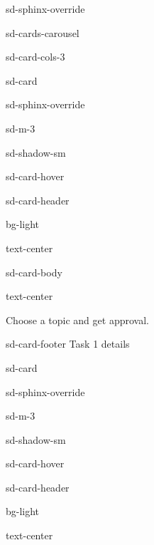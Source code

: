 \documentclass[letterpaper,10pt,english]{jupyterBook}
\let\sphinxpxdimen\pdfpxdimen\else\newdimen\sphinxpxdimen
\begin{document}
\begin{sphinxuseclass}{sd-sphinx-override}
\begin{sphinxuseclass}{sd-cards-carousel}
\begin{sphinxuseclass}{sd-card-cols-3}
\begin{sphinxuseclass}{sd-card}
\begin{sphinxuseclass}{sd-sphinx-override}
\begin{sphinxuseclass}{sd-m-3}
\begin{sphinxuseclass}{sd-shadow-sm}
\begin{sphinxuseclass}{sd-card-hover}
\begin{sphinxuseclass}{sd-card-header}
\begin{sphinxuseclass}{bg-light}
\begin{sphinxuseclass}{text-center}
\sphinxAtStartPar
{}

\end{sphinxuseclass}
\end{sphinxuseclass}
\end{sphinxuseclass}
\begin{sphinxuseclass}{sd-card-body}
\begin{sphinxuseclass}{text-center}
\noindent\sphinxincludegraphics[height=100\sphinxpxdimen]{{idea-b}.png}

\sphinxAtStartPar
Choose a topic and get approval.

\end{sphinxuseclass}
\end{sphinxuseclass}
\begin{sphinxuseclass}{sd-card-footer}
\sphinxAtStartPar
Task 1 details 

\end{sphinxuseclass}
\end{sphinxuseclass}
\end{sphinxuseclass}
\end{sphinxuseclass}
\end{sphinxuseclass}
\end{sphinxuseclass}
\begin{sphinxuseclass}{sd-card}
\begin{sphinxuseclass}{sd-sphinx-override}
\begin{sphinxuseclass}{sd-m-3}
\begin{sphinxuseclass}{sd-shadow-sm}
\begin{sphinxuseclass}{sd-card-hover}
\begin{sphinxuseclass}{sd-card-header}
\begin{sphinxuseclass}{bg-light}
\begin{sphinxuseclass}{text-center}
\sphinxAtStartPar
{}


\end{sphinxuseclass}
\end{sphinxuseclass}
\end{sphinxuseclass}
\end{sphinxuseclass}
\end{sphinxuseclass}
\end{sphinxuseclass}
\end{sphinxuseclass}
\end{sphinxuseclass}
\end{sphinxuseclass}
\end{sphinxuseclass}
\end{sphinxuseclass}
\end{document}
